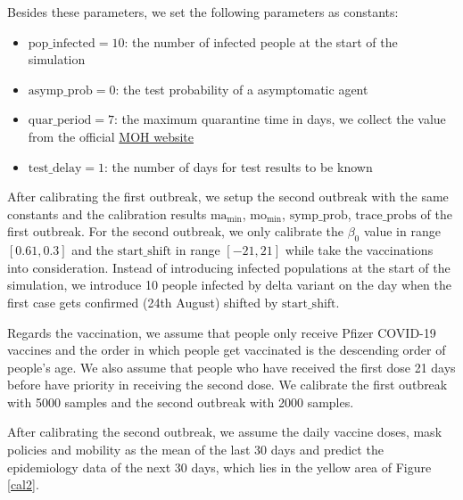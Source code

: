 Besides these parameters, we set the following parameters as constants:
\begin{itemize}
	\item $\text{pop\_infected}=10$: the number of infected people at the start of the simulation
	\item $\text{asymp\_prob}=0$: the test probability of a asymptomatic agent
	\item $\text{quar\_period}=7$: the maximum quarantine time in days, we collect the value from the official \href{https://www.covid.gov.sg/exposed/hrw}{MOH website}
	\item $\text{test\_delay}=1$: the number of days for test results to be known
\end{itemize}

After calibrating the first outbreak, we setup the second outbreak with the same constants and the calibration results $\text{ma}_{\min}$, $\text{mo}_{\min}$, $\text{symp\_prob}$, $\text{trace\_probs}$ of the first outbreak. For the second outbreak, we only calibrate the $\beta_0$ value in range $[0.61,0.3]$ and the $\text{start\_shift}$ in range $[-21,21]$ while take the vaccinations into consideration. Instead of introducing infected populations at the start of the simulation, we introduce 10 people infected by delta variant on the day when the first case gets confirmed (24th August) shifted by  $\text{start\_shift}$.

Regards the vaccination, we assume that people only receive Pfizer COVID-19 vaccines and the order in which people get vaccinated is the descending order of people's age. We also assume that people who have received the first dose 21 days before have priority in receiving the second dose. We calibrate the first outbreak with 5000 samples and the second outbreak with 2000 samples.

After calibrating the second outbreak, we assume the daily vaccine doses, mask policies and mobility as the mean of the last 30 days and predict the epidemiology data of the next 30 days, which lies in the yellow area of Figure \ref{cal2}.
